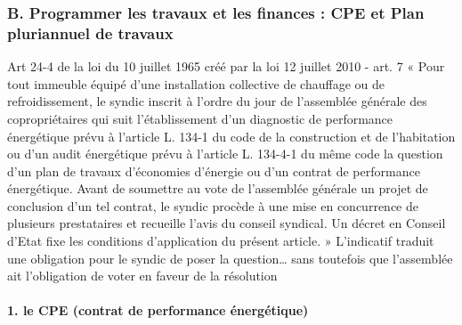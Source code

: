 		\subsubsection{B. Programmer les travaux et les finances : CPE et Plan pluriannuel de travaux}
		
		Art 24-4 de la loi du 10 juillet 1965 créé par la loi 12 juillet 2010 - art. 7
		« Pour tout immeuble équipé d'une installation collective de chauffage ou de refroidissement, le syndic inscrit à l'ordre du jour de l'assemblée générale des copropriétaires qui suit l'établissement d'un diagnostic de performance énergétique prévu à l'article L. 134-1 du code de la construction et de l'habitation ou d'un audit énergétique prévu à l'article L. 134-4-1 du même code la question d'un plan de travaux d'économies d'énergie ou d'un contrat de performance énergétique.
		Avant de soumettre au vote de l'assemblée générale un projet de conclusion d'un tel contrat, le syndic procède à une mise en concurrence de plusieurs prestataires et recueille l'avis du conseil syndical. Un décret en Conseil d'Etat fixe les conditions d'application du présent article. »
		L’indicatif traduit une obligation pour le syndic de poser la question… sans toutefois que l’assemblée ait l’obligation de voter en faveur de la résolution
		
		\paragraph{1. le CPE (contrat de performance énergétique)}
		
